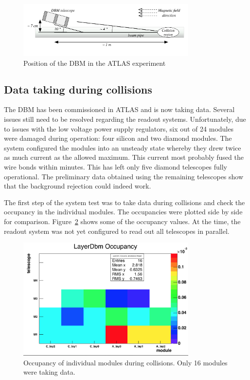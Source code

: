 \begin{figure}[!t]
\centering
\includegraphics[width=0.8\textwidth]{../scripts/04_charge_monitoring/plots/DBM-positioning}
\caption{Position of the DBM in the ATLAS experiment}
\label{fig:dbminatlas}
\end{figure}



\subsection{Data taking during collisions}
The DBM has been commissioned in ATLAS and is now taking data. Several issues still need to be resolved regarding the readout systems. Unfortunately, due to issues with the low voltage power supply regulators, six out of 24 modules were damaged during operation: four silicon and two diamond modules. The system configured the modules into an unsteady state whereby they drew twice as much current as the allowed maximum. This current most probably fused the wire bonds within minutes. This has left only five diamond telescopes fully operational. The preliminary data obtained using the remaining telescopes show that the background rejection could indeed work. 

The first step of the system test was to take data during collisions and check the occupancy in the individual modules. The occupancies were plotted side by side for comparison. Figure~\ref{fig:collocc} shows some of the occupancy values. At the time, the readout system was not yet configured to read out all telescopes in parallel. 
\begin{figure}[!t]
\centering
\includegraphics[width=0.8\textwidth]{04_charge_monitoring/pics/occupancy}
\caption{Occupancy of individual modules during collisions. Only 16 modules were taking data.}
\label{fig:collocc}
\end{figure}

